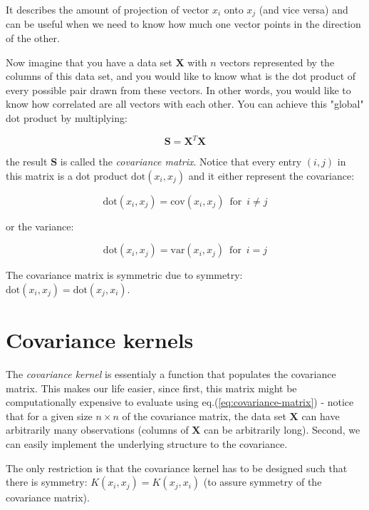 \documentclass[10pt,twocolumn]{article}
\begin{document}
It describes the amount of projection of vector $x_i$ onto $x_j$ (and vice versa) and can be useful when we need to know how much one vector points in the direction of the other.

Now imagine that you have a data set $\mathbf{X}$ with $n$ vectors represented by the columns of this data set, and you would like to know what is the dot product of every possible pair drawn from these vectors. In other words, you would like to know how correlated are all vectors with each other. You can achieve this "global" dot product by multiplying:

\begin{equation}\label{eq:covariance-matrix}
\mathbf{S} = \mathbf{X}^T \mathbf{X} 
\end{equation}

the result $\mathbf{S}$ is called the \textit{covariance matrix}. Notice that every entry $(i,j)$ in this matrix is a dot product $\text{dot}(x_i, x_j)$ and it either represent the covariance:

\begin{equation}
\text{dot}(x_i, x_j) = \text{cov}(x_i, x_j) \,\,\, \text{for} \,\,\, i \neq j
\end{equation}

or the variance:

\begin{equation}
\text{dot}(x_i, x_j) = \text{var}(x_i, x_j) \,\,\, \text{for} \,\,\, i = j
\end{equation}

The covariance matrix is symmetric due to symmetry: $\text{dot}(x_i, x_j) = \text{dot}(x_j, x_i)$.

\section{Covariance kernels}

The \textit{covariance kernel} is essentialy a function that populates the covariance matrix. This makes our life easier, since first, this matrix might be computationally expensive to evaluate using eq.(\ref{eq:covariance-matrix}) - notice that for a given size $n \times n$ of the covariance matrix, the data set $\mathbf{X}$ can have arbitrarily many observations (columns of $\mathbf{X}$ can be arbitrarily long). Second, we can easily implement the underlying structure to the covariance.

The only restriction is that the covariance kernel has to be designed such that there is symmetry: $K(x_i, x_j) = K(x_j, x_i)$ (to assure symmetry of the covariance matrix).
\end{document}
